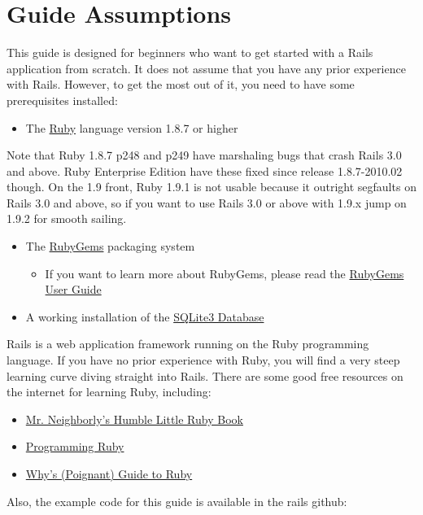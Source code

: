 \documentclass[10pt]{book}
\begin{document}
\section{ Guide Assumptions}

This guide is designed for beginners who want to get started with a Rails application from scratch. It does not assume that you have any prior experience with Rails. However, to get the most out of it, you need to have some prerequisites installed:
\begin{itemize}
	\item The \href{http://www.ruby-lang.org/en/downloads}{Ruby} language version 1.8.7 or higher
\end{itemize}

Note that Ruby 1.8.7 p248 and p249 have marshaling bugs that crash Rails 3.0 and above. Ruby Enterprise Edition have these fixed since release 1.8.7-2010.02 though. On the 1.9 front, Ruby 1.9.1 is not usable because it outright segfaults on Rails 3.0 and above, so if you want to use Rails 3.0 or above with 1.9.x jump on 1.9.2 for smooth sailing.
\begin{itemize}
	\item The \href{http://rubyforge.org/frs/?group_id=126}{RubyGems} packaging system  
\begin{itemize}
	\item If you want to learn more about RubyGems, please read the \href{http://docs.rubygems.org/read/book/1}{RubyGems User Guide}
\end{itemize}
	\item A working installation of the \href{http://www.sqlite.org/}{SQLite3 Database}
\end{itemize}

Rails is a web application framework running on the Ruby programming language. If you have no prior experience with Ruby, you will find a very steep learning curve diving straight into Rails. There are some good free resources on the internet for learning Ruby, including:
\begin{itemize}
	\item \href{http://www.humblelittlerubybook.com/}{Mr. Neighborly’s Humble Little Ruby Book}
	\item \href{http://www.ruby-doc.org/docs/ProgrammingRuby/}{Programming Ruby}
	\item \href{http://mislav.uniqpath.com/poignant-guide/}{Why’s (Poignant) Guide to Ruby}
\end{itemize}

Also, the example code for this guide is available in the rails github:
\end{document}

